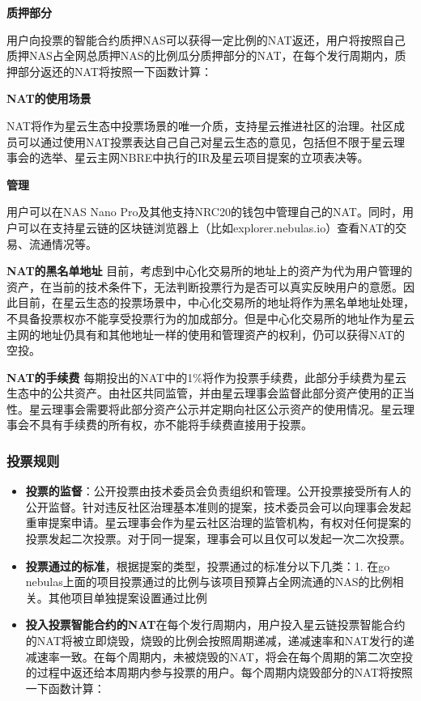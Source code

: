 \begin{enumerate}
\textbf{质押部分}

用户向投票的智能合约质押NAS可以获得一定比例的NAT返还，用户将按照自己质押NAS占全网总质押NAS的比例瓜分质押部分的NAT，在每个发行周期内，质押部分返还的NAT将按照一下函数计算：

\textbf{NAT的使用场景}

NAT将作为星云生态中投票场景的唯一介质，支持星云推进社区的治理。社区成员可以通过使用NAT投票表达自己自己对星云生态的意见，包括但不限于星云理事会的选举、星云主网NBRE中执行的IR及星云项目提案的立项表决等。

\textbf{管理}

用户可以在NAS Nano Pro及其他支持NRC20的钱包中管理自己的NAT。同时，用户可以在支持星云链的区块链浏览器上（比如explorer.nebulas.io）查看NAT的交易、流通情况等。

\textbf{NAT的黑名单地址}
目前，考虑到中心化交易所的地址上的资产为代为用户管理的资产，在当前的技术条件下，无法判断投票行为是否可以真实反映用户的意愿。因此目前，在星云生态的投票场景中，中心化交易所的地址将作为黑名单地址处理，不具备投票权亦不能享受投票行为的加成部分。但是中心化交易所的地址作为星云主网的地址仍具有和其他地址一样的使用和管理资产的权利，仍可以获得NAT的空投。

\textbf{NAT的手续费}
每期投出的NAT中的1\%将作为投票手续费，此部分手续费为星云生态中的公共资产。由社区共同监管，并由星云理事会监督此部分资产使用的正当性。星云理事会需要将此部分资产公示并定期向社区公示资产的使用情况。星云理事会不具有手续费的所有权，亦不能将手续费直接用于投票。

\subsubsection{投票规则}

\begin{itemize}
	\item \textbf{投票的监督}：公开投票由技术委员会负责组织和管理。公开投票接受所有人的公开监督。针对违反社区治理基本准则的提案，技术委员会可以向理事会发起重审提案申请。星云理事会作为星云社区治理的监管机构，有权对任何提案的投票发起二次投票。对于同一提案，理事会可以且仅可以发起一次二次投票。
	\item \textbf{投票通过的标准}，根据提案的类型，投票通过的标准分以下几类：1. 在go nebulas上面的项目投票通过的比例与该项目预算占全网流通的NAS的比例相关。其他项目单独提案设置通过比例
	\item \textbf{投入投票智能合约的NAT}在每个发行周期内，用户投入星云链投票智能合约的NAT将被立即烧毁，烧毁的比例会按照周期递减，递减速率和NAT发行的递减速率一致。在每个周期内，未被烧毁的NAT，将会在每个周期的第二次空投的过程中返还给本周期内参与投票的用户。每个周期内烧毁部分的NAT将按照一下函数计算：
	

\end{itemize}
\end{enumerate}
